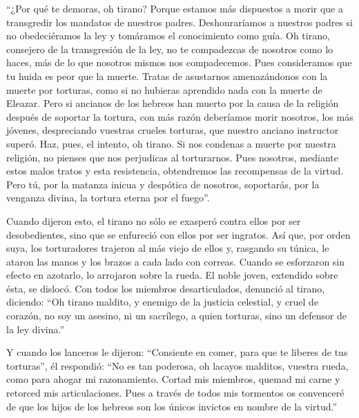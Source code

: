  ``¿Por qué te demoras, oh tirano? Porque estamos más
dispuestos a morir que a transgredir los mandatos de nuestros padres.
 Deshonraríamos a nuestros padres si no obedeciéramos la
ley y tomáramos el conocimiento como guía.  Oh tirano,
consejero de la transgresión de la ley, no te compadezcas de nosotros
como lo haces, más de lo que nosotros mismos nos compadecemos.
 Pues consideramos que tu huida es peor que la muerte.
 Tratas de asustarnos amenazándonos con la muerte por
torturas, como si no hubieras aprendido nada con la muerte de Eleazar.
 Pero si ancianos de los hebreos han muerto por la causa
de la religión después de soportar la tortura, con más razón deberíamos
morir nosotros, los más jóvenes, despreciando vuestras crueles torturas,
que nuestro anciano instructor superó.  Haz, pues, el
intento, oh tirano. Si nos condenas a muerte por nuestra religión, no
pienses que nos perjudicas al torturarnos.  Pues nosotros,
mediante estos malos tratos y esta resistencia, obtendremos las
recompensas de la virtud.  Pero tú, por la matanza inicua
y despótica de nosotros, soportarás, por la venganza divina, la tortura
eterna por el fuego''.

 Cuando dijeron esto, el tirano no sólo se exasperó
contra ellos por ser desobedientes, sino que se enfureció con ellos por
ser ingratos.  Así que, por orden suya, los torturadores
trajeron al más viejo de ellos y, rasgando su túnica, le ataron las
manos y los brazos a cada lado con correas.  Cuando se
esforzaron sin efecto en azotarlo, lo arrojaron sobre la rueda.
 El noble joven, extendido sobre ésta, se dislocó.
 Con todos los miembros desarticulados, denunció al
tirano, diciendo:  ``Oh tirano maldito, y enemigo de la
justicia celestial, y cruel de corazón, no soy un asesino, ni un
sacrílego, a quien torturas, sino un defensor de la ley divina.''

 Y cuando los lanceros le dijeron: ``Consiente en comer,
para que te liberes de tus torturas'',  él respondió:
``No es tan poderosa, oh lacayos malditos, vuestra rueda, como para
ahogar mi razonamiento. Cortad mis miembros, quemad mi carne y retorced
mis articulaciones.  Pues a través de todos mis tormentos
os convenceré de que los hijos de los hebreos son los únicos invictos en
nombre de la virtud.''

